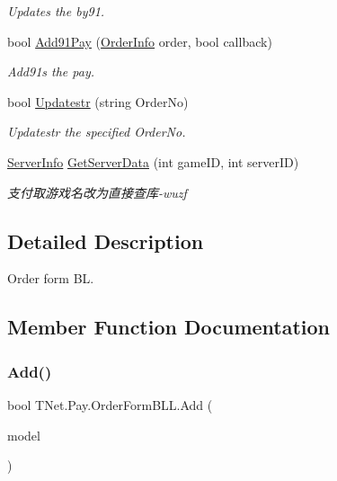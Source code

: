 \begin{DoxyCompactItemize}
\begin{DoxyCompactList}\small\item\em Updates the by91. \end{DoxyCompactList}\item 
bool \mbox{\hyperlink{class_t_net_1_1_pay_1_1_order_form_b_l_l_ad5797704f79a99f6162a4f260369a8b1}{Add91\+Pay}} (\mbox{\hyperlink{class_t_net_1_1_pay_1_1_order_info}{Order\+Info}} order, bool callback)
\begin{DoxyCompactList}\small\item\em Add91s the pay. \end{DoxyCompactList}\item 
bool \mbox{\hyperlink{class_t_net_1_1_pay_1_1_order_form_b_l_l_ac48da1e64f8bd3f2555e086ffaf89f72}{Updatestr}} (string Order\+No)
\begin{DoxyCompactList}\small\item\em Updatestr the specified Order\+No. \end{DoxyCompactList}\item 
\mbox{\hyperlink{class_t_net_1_1_pay_1_1_server_info}{Server\+Info}} \mbox{\hyperlink{class_t_net_1_1_pay_1_1_order_form_b_l_l_afd0293f291f096f9a8115518dccedcb1}{Get\+Server\+Data}} (int game\+ID, int server\+ID)
\begin{DoxyCompactList}\small\item\em 支付取游戏名改为直接查库-\/wuzf \end{DoxyCompactList}\end{DoxyCompactItemize}


\subsection{Detailed Description}
Order form BL. 



\subsection{Member Function Documentation}
\mbox{\label{class_t_net_1_1_pay_1_1_order_form_b_l_l_aca0c2ed0708f0e2a5b0d10b826bbcf40}} 
\subsubsection{\texorpdfstring{Add()}{Add()}}
{\footnotesize\ttfamily bool T\+Net.\+Pay.\+Order\+Form\+B\+L\+L.\+Add (\begin{DoxyParamCaption}\item[{\mbox{\hyperlink{class_t_net_1_1_pay_1_1_order_info}{Order\+Info}}}]{model }\end{DoxyParamCaption})}



